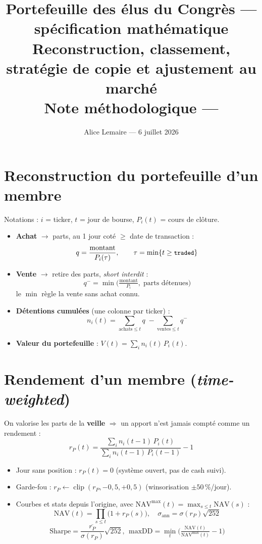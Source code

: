 \documentclass[10pt,a4paper,twocolumn]{article}
\title{\vspace{-1.8em}\textbf{Portefeuille des élus du Congrès --- spécification mathématique}\\[2pt]
\large Reconstruction, classement, stratégie de copie et ajustement au marché\\[1pt]
\small Note méthodologique --- \code{05\_Portefeuille\_Membre\_V1.ipynb}}
\author{\small Alice Lemaire --- 6 juillet 2026}
\date{\vspace{-2.6em}}
\newcommand{\code}[1]{\texttt{\small #1}}
\begin{document}
\maketitle

\section{Reconstruction du portefeuille d'un membre}
Notations : $i$ = ticker, $t$ = jour de bourse, $P_i(t)$ = cours de clôture.
\begin{itemize}
  \item \textbf{Achat} $\to$ parts, au 1\ier{} jour coté $\ge$ date de transaction :
        $$q = \frac{\text{montant}}{P_i(\tau)},\qquad \tau = \min\{t \ge \code{traded}\}$$
  \item \textbf{Vente} $\to$ retire des parts, \emph{short interdit} :
        $$q^- = \min\!\Big(\tfrac{\text{montant}}{P_i},\; \text{parts détenues}\Big)$$
        le $\min$ règle la vente sans achat connu.
  \item \textbf{Détentions cumulées} (une colonne par ticker) :
        $$n_i(t) = \!\!\sum_{\text{achats}\le t}\! q \;-\!\! \sum_{\text{ventes}\le t}\! q^-$$
  \item \textbf{Valeur du portefeuille} : $\displaystyle V(t) = \sum_i n_i(t)\,P_i(t)$.
\end{itemize}

\section{Rendement d'un membre (\emph{time-weighted})}
On valorise les parts de la \textbf{veille} $\Rightarrow$ un apport n'est jamais compté comme un rendement :
$$r_P(t) = \frac{\sum_i n_i(t-1)\,P_i(t)}{\sum_i n_i(t-1)\,P_i(t-1)} - 1$$
\begin{itemize}
  \item Jour sans position : $r_P(t)=0$ (système ouvert, pas de cash suivi).
  \item Garde-fou : $r_P \leftarrow \operatorname{clip}(r_P,-0{,}5,+0{,}5)$ (winsorisation $\pm 50\,\%$/jour).
  \item Courbes et stats depuis l'origine, avec $\mathrm{NAV}^{\max}(t)=\max_{s\le t}\mathrm{NAV}(s)$ :
        $$\mathrm{NAV}(t)=\!\prod_{s\le t}\!\big(1+r_P(s)\big),\quad
          \sigma_{\text{ann}}=\sigma(r_P)\sqrt{252}$$
        $$\mathrm{Sharpe}=\frac{\overline{r_P}}{\sigma(r_P)}\sqrt{252},\ \
          \mathrm{maxDD}=\min_t\!\Big(\tfrac{\mathrm{NAV}(t)}{\mathrm{NAV}^{\max}(t)}-1\Big)$$
\end{itemize}
\end{document}
